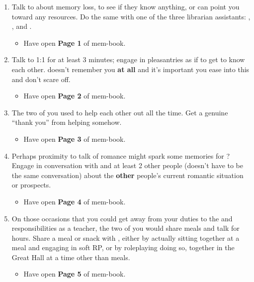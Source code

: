 \documentclass[green]{GL2020}
\begin{document}
\begin{enumerate}
  \item Talk to \cLibrarian{\full} about memory loss, to see if they know anything, or can point you toward any resources. Do the same with one of the three librarian assistants: \cAmbition{\full}, \cLibAssist{\full}, and \cPresident{\full}.
  \begin{itemize}
    \item Have \cHeadScientist{} open \textbf{Page 1} of \cHeadScientist{\their} mem-book. 
  \end{itemize}
  \item Talk to \cHeadScientist{} 1:1 for at least 3 minutes; engage in pleasantries as if to get to know each other. \cHeadScientist{} doesn’t remember you \textbf{at all} and it’s important you ease into this and don’t scare \cHeadScientist{\them} off.
  \begin{itemize}
    \item Have \cHeadScientist{} open \textbf{Page 2} of \cHeadScientist{\their} mem-book.
  \end{itemize}
  \item The two of you used to help each other out all the time. Get a genuine “thank you” from helping \cHeadScientist{} somehow.
  \begin{itemize}
    \item Have \cHeadScientist{} open \textbf{Page 3} of \cHeadScientist{\their} mem-book.
  \end{itemize}
  \item Perhaps proximity to talk of romance might spark some memories for \cHeadScientist{}? Engage in conversation with \cHeadScientist{} and at least 2 other people (doesn’t have to be the same conversation) about the \textbf{other} people’s current romantic situation or prospects.
  \begin{itemize}
    \item Have \cHeadScientist{} open \textbf{Page 4} of \cHeadScientist{\their} mem-book.
  \end{itemize}
  \item On those occasions that you could get away from your duties to the \pGoaties{} and responsibilities as a teacher, the two of you would share meals and talk for hours. Share a meal or snack with \cHeadScientist{}, either by actually sitting together at a meal and engaging in soft RP, or by roleplaying doing so, together in the Great Hall at a time other than meals.
  \begin{itemize}
    \item Have \cHeadScientist{} open \textbf{Page 5} of \cHeadScientist{\their} mem-book.

\end{itemize}
\end{enumerate}
\end{document}
